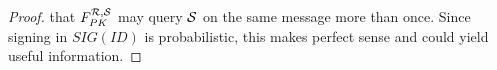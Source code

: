 \begin{proof}
that $F^{\mathcal{R},\mathcal{S}}_{PK}$ may query $\mathcal{S}$ on the same message more than
once.  Since signing in $SIG(ID)$ is probabilistic, this makes perfect sense
and could yield useful information.


\end{proof}
